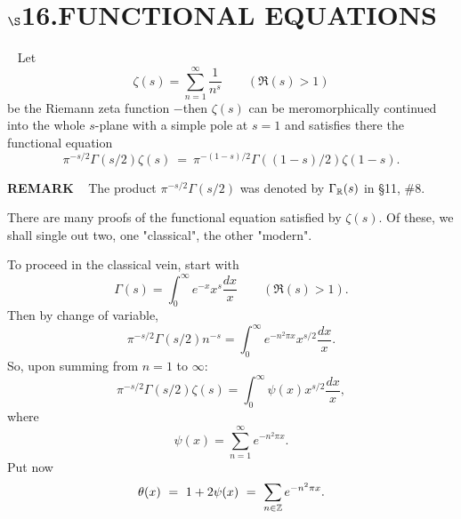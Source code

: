 \chapter{
$\boldsymbol{\S}$\textbf{16}.\quad  FUNCTIONAL EQUATIONS}
\setlength\parindent{2em}
\setcounter{theoremn}{0}

\ \indent 
Let
\[
\zeta(s) = \sum_{n = 1}^\infty \frac{1}{n^s}	\qquad \text{$(\Re(s) > 1)$}
\]
be the Riemann zeta function $-$then $\zeta(s)$ can be meromorphically continued into the whole 
$s$-plane with a simple pole at $s = 1$ and satisfies there the functional equation
\[
\pi^{-s/2}\Gamma(s/2)\zeta(s) \ =\  \pi^{-(1-s)/2}\Gamma((1-s)/2)\zeta(1-s).
\]

\vspace{0.2cm}


\begin{x}{\small\bf REMARK} \ %
The product $\pi^{-s/2}\Gamma(s/2)$ was denoted by $\Gamma_{\mathbb{R}}(s)$ in \S11, \#8.
\end{x}

\vspace{0.1cm}

There are many proofs of the functional equation satisfied by $\zeta(s)$.  Of these, we shall single out two, one "classical", the other "modern".

\vspace{0.25cm}

To proceed in the classical vein, start with 
\[
\Gamma(s) = \int_0^\infty e^{-x} x^s \frac{dx}{x}			\qquad (\Re(s) > 1).
\]
Then by change of variable, 
\[
\pi^{-s/2}\Gamma(s/2)n^{-s} = \int_0^\infty e^{-n^2\pi x}x^{s/2} \frac{dx}{x}.
\]
So, upon summing from $n = 1$ to $\infty$:
\[
\pi^{-s/2}\Gamma(s/2)\zeta(s) = \int_0^\infty \psi(x) x^{s/2} \frac{dx}{x},
\]
where
\[
\psi(x) = \sum_{n=1}^\infty e^{-n^2\pi x}.
\]
Put now
\[
\theta(x) \ =\  1 + 2\psi(x) \ =\  \sum_{n \in \Z} e^{-n^2\pi x}.
\]

\vspace{0.1cm}

